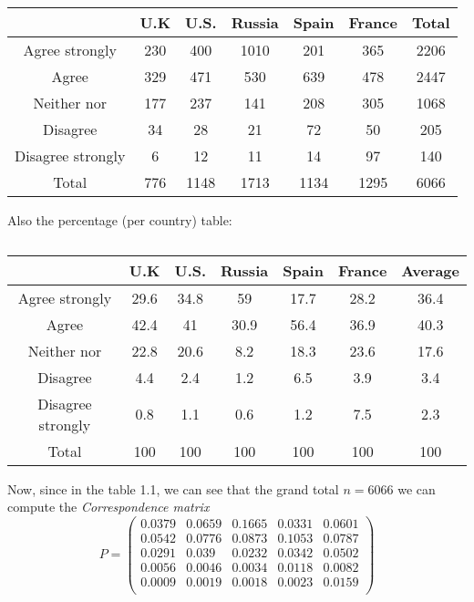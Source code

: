 \documentclass[12pt]{extarticle}
\numberwithin{equation}{section}
\begin{document}
    \begin{table}[h]
    \centering
    \begin{tabular}{c c c c c c c }
    \hline
    \hspace{1pt} & U.K   & U.S. & Russia & Spain & France & Total \\ \hline
       Agree strongly  & 230 & 400& 1010 & 201 & 365 & 2206 \\
       Agree  & 329 & 471 & 530 & 639 & 478 & 2447 \\
       Neither nor & 177 & 237 & 141 & 208 & 305 & 1068 \\
       Disagree & 34 & 28 & 21 & 72 & 50 & 205 \\
       Disagree strongly & 6 & 12 & 11 & 14 & 97 & 140 \\
       Total & 776 & 1148 & 1713 & 1134 & 1295 & 6066  \\
       \hline
    \end{tabular}
    \label{Table 1.1}
\end{table}
\newpage
Also the percentage (per country) table: 
    \begin{table}[H]
    \centering
    \begin{tabular}{c c c c c c c }
    \hline
    \hspace{1pt} & U.K   & U.S. & Russia & Spain & France & Average \\ \hline
       Agree strongly  & 29.6 & 34.8 & 59 &17.7 & 28.2 & 36.4 \\
       Agree  & 42.4 & 41 & 30.9 &56.4 & 36.9 & 40.3 \\
       Neither nor &22.8 &20.6 &8.2 & 18.3 & 23.6 & 17.6 \\
       Disagree &4.4 &2.4 &1.2 &6.5 &3.9 &3.4 \\
       Disagree strongly &0.8 &1.1 &0.6 &1.2 &7.5 &2.3 \\
       Total & 100 & 100 & 100 & 100 & 100 & 100  \\
       \hline
    \end{tabular}
    \caption{}
    \label{Table 1.2}
\end{table}
Now, since in the table 1.1, we can see that the grand total $n=6066$ we can compute the \emph{Correspondence matrix} 
$$P = \begin{pmatrix}
0.0379 & 0.0659 &  0.1665 & 0.0331 & 0.0601 \\
0.0542 & 0.0776 &  0.0873 & 0.1053 & 0.0787 \\
0.0291 & 0.039 & 0.0232 & 0.0342 & 0.0502 \\
0.0056 & 0.0046 & 0.0034 & 0.0118 & 0.0082 \\
0.0009 & 0.0019 & 0.0018 & 0.0023 & 0.0159 \\
\end{pmatrix}$$
\end{document}
